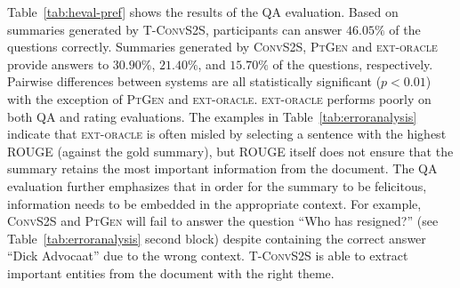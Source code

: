 




 

Table~\ref{tab:heval-pref} shows the results of the QA
evaluation. Based on summaries generated by \mbox{\textsc{T-ConvS2S}},
participants can answer $46.05\%$ of the questions
correctly. Summaries generated by \textsc{ConvS2S}, \textsc{PtGen} and
\textsc{ext-oracle} provide answers to $30.90\%$, $21.40\%$, and
$15.70\%$ of the questions, respectively. Pairwise differences between
systems are all statistically significant ($p < 0.01$) with the
exception of \textsc{PtGen} and \textsc{ext-oracle}.
\textsc{ext-oracle} performs poorly on both QA and rating
evaluations. The examples in Table~\ref{tab:erroranalysis} indicate
that \textsc{ext-oracle} is often misled by selecting a sentence with
the highest ROUGE (against the gold summary), but ROUGE itself does
not ensure that the summary retains the most important information
from the document.  The QA evaluation further emphasizes that in order
for the summary to be felicitous, information needs to be embedded in
the appropriate context. For example, \textsc{ConvS2S} and
\textsc{PtGen} will fail to answer the question ``Who has resigned?''
(see Table~\ref{tab:erroranalysis} second block) despite containing
the correct answer ``Dick Advocaat'' due to the wrong
context. \mbox{\textsc{T-ConvS2S}} is able to extract
important entities from the document with the right theme.






